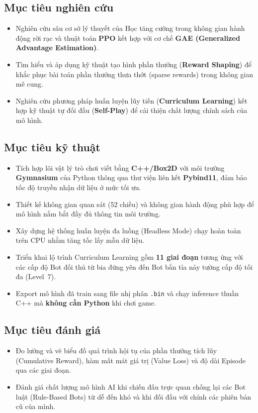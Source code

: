 \documentclass[a4paper, 12pt]{report}
\begin{document}
  \subsection{Mục tiêu nghiên cứu}
  \begin{itemize}
    \item Nghiên cứu sâu cơ sở lý thuyết của Học tăng cường trong không gian hành động rời rạc và thuật toán \textbf{PPO} kết hợp với cơ chế \textbf{GAE (Generalized Advantage Estimation)}.
    \item Tìm hiểu và áp dụng kỹ thuật tạo hình phần thưởng (\textbf{Reward Shaping}) để khắc phục bài toán phần thưởng thưa thớt (sparse rewards) trong không gian mê cung.
    \item Nghiên cứu phương pháp huấn luyện lũy tiến (\textbf{Curriculum Learning}) kết hợp kỹ thuật tự đối đầu (\textbf{Self-Play}) để cải thiện chất lượng chính sách của mô hình.
  \end{itemize}

  \subsection{Mục tiêu kỹ thuật}
  \begin{itemize}
    \item Tích hợp lõi vật lý trò chơi viết bằng \textbf{C++/Box2D} với môi trường \textbf{Gymnasium} của Python thông qua thư viện liên kết \textbf{Pybind11}, đảm bảo tốc độ truyền nhận dữ liệu ở mức tối ưu.
    \item Thiết kế không gian quan sát (52 chiều) và không gian hành động phù hợp để mô hình nắm bắt đầy đủ thông tin môi trường.
    \item Xây dựng hệ thống huấn luyện đa luồng (Headless Mode) chạy hoàn toàn trên CPU nhằm tăng tốc lấy mẫu dữ liệu.
    \item Triển khai lộ trình Curriculum Learning gồm \textbf{11 giai đoạn} tương ứng với các cấp độ Bot đối thủ từ bia đứng yên đến Bot bắn tỉa nảy tường cấp độ tối đa (Level~7).
    \item Export mô hình đã train sang file nhị phân \texttt{.bin} và chạy inference thuần C++ mà \textbf{không cần Python} khi chơi game.
  \end{itemize}

  \subsection{Mục tiêu đánh giá}
  \begin{itemize}
    \item Đo lường và vẽ biểu đồ quá trình hội tụ của phần thưởng tích lũy (Cumulative Reward), hàm mất mát giá trị (Value Loss) và độ dài Episode qua các giai đoạn.
    \item Đánh giá chất lượng mô hình AI khi chiến đấu trực quan chống lại các Bot luật (Rule-Based Bots) từ dễ đến khó và khi đối đầu với chính các phiên bản cũ của mình.
  \end{itemize}
\end{document}
